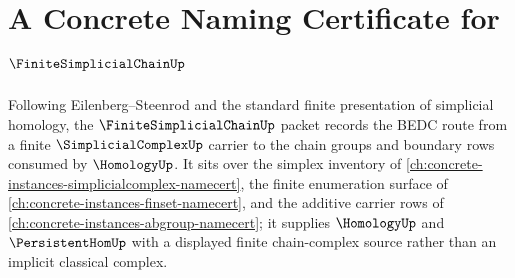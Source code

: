 \chapter{A Concrete Naming Certificate for $\FiniteSimplicialChainUp$}
\label{ch:concrete-instances-finite-simplicial-chain-namecert}

Following Eilenberg--Steenrod and the standard finite presentation of simplicial homology, the $\FiniteSimplicialChainUp$ packet records the BEDC route from a finite $\SimplicialComplexUp$ carrier to the chain groups and boundary rows consumed by $\HomologyUp$. It sits over the simplex inventory of \autoref{ch:concrete-instances-simplicialcomplex-namecert}, the finite enumeration surface of \autoref{ch:concrete-instances-finset-namecert}, and the additive carrier rows of \autoref{ch:concrete-instances-abgroup-namecert}; it supplies $\HomologyUp$ and $\PersistentHomUp$ with a displayed finite chain-complex source rather than an implicit classical complex.

